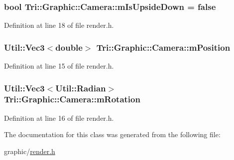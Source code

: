 \hypertarget{class_tri_1_1_graphic_1_1_camera_a2488f8451d905297a6085529f1777de9}{}
\subsubsection[{m\+Is\+Upside\+Down}]{\setlength{\rightskip}{0pt plus 5cm}bool Tri\+::\+Graphic\+::\+Camera\+::m\+Is\+Upside\+Down = false\hspace{0.3cm}{\ttfamily [protected]}}\label{class_tri_1_1_graphic_1_1_camera_a2488f8451d905297a6085529f1777de9}


Definition at line 18 of file render.\+h.

\hypertarget{class_tri_1_1_graphic_1_1_camera_ad813eaa168e21644d89f69cd255f0643}{}
\subsubsection[{m\+Position}]{\setlength{\rightskip}{0pt plus 5cm}Util\+::\+Vec3$<$double$>$ Tri\+::\+Graphic\+::\+Camera\+::m\+Position\hspace{0.3cm}{\ttfamily [protected]}}\label{class_tri_1_1_graphic_1_1_camera_ad813eaa168e21644d89f69cd255f0643}


Definition at line 15 of file render.\+h.

\hypertarget{class_tri_1_1_graphic_1_1_camera_a81ca7e49b98bfc6517200ccd2ff89098}{}
\subsubsection[{m\+Rotation}]{\setlength{\rightskip}{0pt plus 5cm}Util\+::\+Vec3$<$Util\+::\+Radian$>$ Tri\+::\+Graphic\+::\+Camera\+::m\+Rotation\hspace{0.3cm}{\ttfamily [protected]}}\label{class_tri_1_1_graphic_1_1_camera_a81ca7e49b98bfc6517200ccd2ff89098}


Definition at line 16 of file render.\+h.



The documentation for this class was generated from the following file\+:\begin{DoxyCompactItemize}
\item 
graphic/\hyperlink{render_8h}{render.\+h}\end{DoxyCompactItemize}
